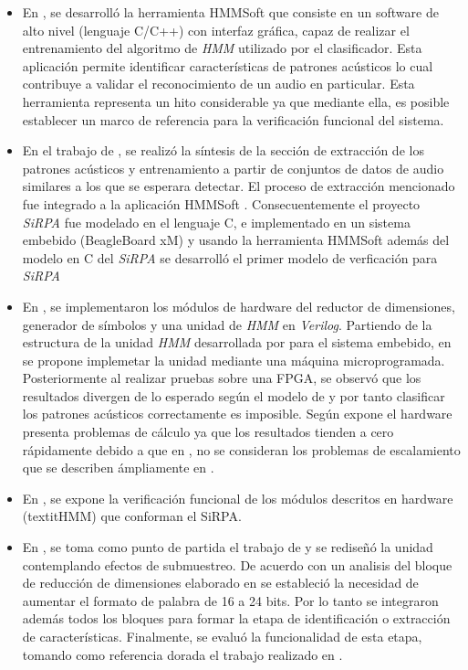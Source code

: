 \begin{itemize}
\item {En \cite{Jcardenas}, se desarrolló la herramienta HMMSoft que consiste en un software de alto nivel (lenguaje C/C++) con interfaz gráfica, capaz de realizar el entrenamiento del algoritmo de \textit{HMM} utilizado por el clasificador. Esta aplicación permite identificar características de patrones acústicos lo cual contribuye a validar el reconocimiento de un audio en particular. Esta herramienta representa un hito considerable ya que mediante ella, es posible establecer un marco de referencia para la verificación funcional del sistema.}

\item {En el trabajo de \cite{Jordanthesis}, se realizó la síntesis de la sección de extracción de los patrones acústicos y entrenamiento a partir de conjuntos de datos de audio similares a los que se esperara detectar. El proceso de extracción mencionado fue integrado a la aplicación HMMSoft \cite{Jcardenas}. Consecuentemente el proyecto \textit{SiRPA} fue modelado en el lenguaje C, e implementado en un sistema embebido (BeagleBoard xM)  \cite{website:beagleboard} y usando la herramienta HMMSoft además del modelo en C del \textit{SiRPA} se desarrolló el primer modelo de verficación para \textit{SiRPA}} 

\item {En \cite{Lalfaro}, se implementaron los módulos de hardware del reductor de dimensiones, generador de símbolos y una unidad de \textit{HMM} en \textit{Verilog}. Partiendo de la estructura de la unidad \textit{HMM} desarrollada por \cite{Jordanthesis} para el sistema embebido, en \cite{Lalfaro} se propone implemetar la unidad mediante una máquina microprogramada. Posteriormente al realizar pruebas sobre una FPGA, se observó que los resultados divergen de lo esperado según el modelo de \cite{Jordanthesis} y por tanto clasificar los patrones acústicos correctamente es imposible. Según expone \cite{Carlosthesis} el hardware presenta problemas de cálculo ya que los resultados tienden a cero rápidamente debido a que en \cite{Lalfaro}, no se consideran los problemas de escalamiento que se describen ámpliamente en \cite{LRabiner}.}

\item {En \cite{Mau}, se expone la verificación funcional de los módulos descritos en hardware (textit{HMM}) que conforman el SiRPA.}

\item {En \cite{mio}, se toma como punto de partida el trabajo de \cite{Esalas} y se rediseñó la unidad contemplando efectos de submuestreo. De acuerdo con un analisis del bloque de reducción de dimensiones elaborado en \cite{Lalfaro} se estableció la necesidad de aumentar el formato de palabra de 16 a 24 bits. Por lo tanto se integraron además todos los bloques para formar la etapa de identificación o extracción de características. Finalmente, se evaluó la funcionalidad de esta etapa, tomando como referencia dorada el trabajo realizado en \cite{Jordanthesis}.}


\end{itemize}
